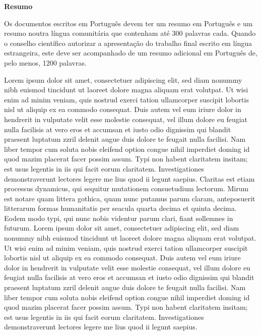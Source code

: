 
\vspace*{2cm}
\begin{center} \Large \bf Resumo
\end{center}
\vspace*{1cm} \setlength{\baselineskip}{0.6cm}

Os documentos escritos em Portugu\^{e}s devem ter um resumo em Portugu\^{e}s e um resumo noutra l\'{i}ngua comunit\'{a}ria que contenham at\'{e} 300 palavras cada. Quando o conselho cient\'{i}fico autorizar a apresenta\c{c}\~{a}o do trabalho final escrito em l\'{i}ngua estrangeira, este deve ser acompanhado de um resumo adicional em Portugu\^{e}s de, pelo menos, 1200 palavras.

Lorem ipsum dolor sit amet, consectetuer adipiscing elit, sed diam nonummy nibh euismod tincidunt ut laoreet dolore magna aliquam erat volutpat. Ut wisi enim ad minim veniam, quis nostrud exerci tation ullamcorper suscipit lobortis nisl ut aliquip ex ea commodo consequat. Duis autem vel eum iriure dolor in hendrerit in vulputate velit esse molestie consequat, vel illum dolore eu feugiat nulla facilisis at vero eros et accumsan et iusto odio dignissim qui blandit praesent luptatum zzril delenit augue duis dolore te feugait nulla facilisi. Nam liber tempor cum soluta nobis eleifend option congue nihil imperdiet doming id quod mazim placerat facer possim assum. Typi non habent claritatem insitam; est usus legentis in iis qui facit eorum claritatem. Investigationes demonstraverunt lectores legere me lius quod ii legunt saepius. Claritas est etiam processus dynamicus, qui sequitur mutationem consuetudium lectorum. Mirum est notare quam littera gothica, quam nunc putamus parum claram, anteposuerit litterarum formas humanitatis per seacula quarta decima et quinta decima. Eodem modo typi, qui nunc nobis videntur parum clari, fiant sollemnes in futurum. Lorem ipsum dolor sit amet, consectetuer adipiscing elit, sed diam nonummy nibh euismod tincidunt ut laoreet dolore magna aliquam erat volutpat. Ut wisi enim ad minim veniam, quis nostrud exerci tation ullamcorper suscipit lobortis nisl ut aliquip ex ea commodo consequat. Duis autem vel eum iriure dolor in hendrerit in vulputate velit esse molestie consequat, vel illum dolore eu feugiat nulla facilisis at vero eros et accumsan et iusto odio dignissim qui blandit praesent luptatum zzril delenit augue duis dolore te feugait nulla facilisi. Nam liber tempor cum soluta nobis eleifend option congue nihil imperdiet doming id quod mazim placerat facer possim assum. Typi non habent claritatem insitam; est usus legentis in iis qui facit eorum claritatem. Investigationes demonstraverunt lectores legere me lius quod ii legunt saepius.

